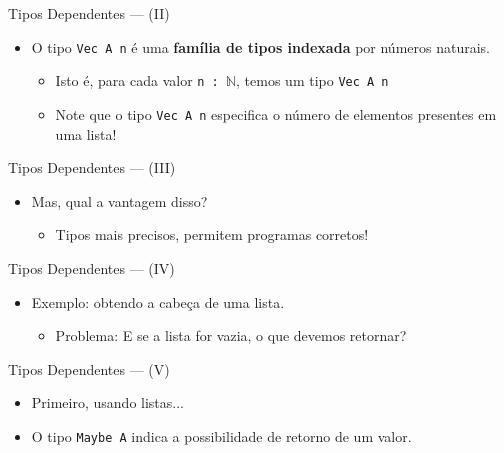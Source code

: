 \documentclass{beamer}
\begin{document}
       \begin{frame}{Tipos Dependentes --- (II)}
         \begin{itemize}
           \item O tipo \texttt{Vec A n} \'e uma \textbf{fam\'ilia de tipos indexada} por n\'umeros naturais.
           \begin{itemize}
             \item Isto \'e, para cada valor \texttt{n : $\mathbb{N}$}, temos um tipo \texttt{Vec A n}
             \item Note que o tipo \texttt{Vec A n} especifica o n\'umero de elementos presentes em uma lista!
           \end{itemize}
         \end{itemize}
       \end{frame}

       \begin{frame}{Tipos Dependentes --- (III)}
         \begin{itemize}
           \item Mas, qual a vantagem disso?
           \begin{itemize}
             \item Tipos mais precisos, permitem programas corretos!
           \end{itemize}
         \end{itemize}         
       \end{frame}

       \begin{frame}{Tipos Dependentes --- (IV)}
         \begin{itemize}
           \item Exemplo: obtendo a cabe\c{c}a de uma lista.
           \begin{itemize}
             \item Problema: E se a lista for vazia, o que devemos retornar?
           \end{itemize}
         \end{itemize}
       \end{frame}

       \begin{frame}{Tipos Dependentes --- (V)}
         \begin{itemize}
           \item Primeiro, usando listas...
           \item O tipo \texttt{Maybe A} indica a possibilidade de retorno de um valor.
         \end{itemize}
       \end{frame}
\end{document}
